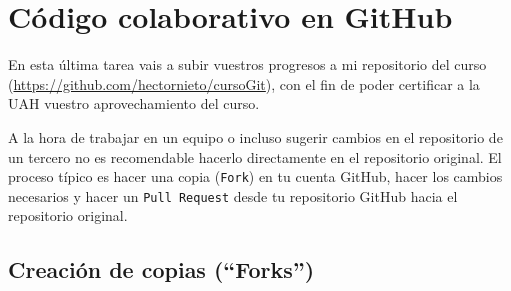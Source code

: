 \documentclass[a5paper,10pt]{article}
\begin{document}
  \section{Código colaborativo en GitHub}
   En esta última tarea vais a subir vuestros progresos a mi repositorio del curso (\url{https://github.com/hectornieto/cursoGit}), con el fin de poder certificar a la UAH vuestro aprovechamiento del curso.
   
   A la hora de trabajar en un equipo o incluso sugerir cambios en el repositorio de un tercero no es recomendable hacerlo directamente en el repositorio original. El proceso típico es hacer una copia (\verb+Fork+) en tu cuenta GitHub, hacer los cambios necesarios y hacer un \verb+Pull Request+ desde tu repositorio GitHub hacia el repositorio original.
   
   \subsection{Creación de copias (``Forks'')}
\end{document}
